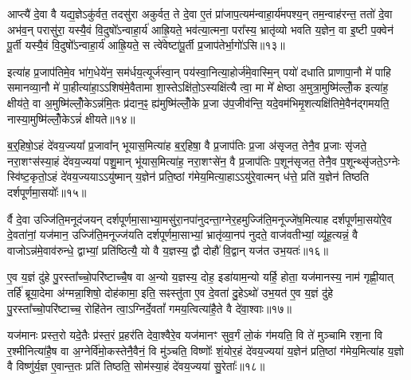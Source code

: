 आप्त्यै॑ दे॒वा वै यद्य॒ज्ञे\-ऽकु॑र्वत॒ तदसु॑रा अकुर्वत॒ ते दे॒वा ए॒तं प्रा॑जाप॒त्यम॑न्वाहा॒र्य॑मपश्य॒न् तम॒न्वाह॑रन्त॒ ततो॑ दे॒वा अभ॑व॒न् परासु॑रा॒ यस्यै॒वं वि॒दुषो᳚\-ऽन्वाहा॒र्य॑ आह्रि॒यते॒ भव॑त्या॒त्मना॒ परा᳚स्य॒ भ्रातृ॑व्यो भवति य॒ज्ञेन॒ वा इ॒ष्टी प॒क्वेन॑ पू॒र्ती यस्यै॒वं वि॒दुषो᳚\-ऽन्वाहा॒र्य॑ आह्रि॒यते॒ स त्वे॑वेष्टा॑पू॒र्ती प्र॒जाप॑तेर्भा॒गो॑\-ऽसि॥१३॥

इत्या॑ह प्र॒जाप॑तिमे॒व भा॑ग॒धेये॑न॒ सम॑र्धय॒त्यूर्ज॑स्वा॒न् पय॑स्वा॒नित्या॒होर्ज॑मे॒वास्मि॒न् पयो॑ दधाति प्राणापा॒नौ मे॑ पाहि समानव्या॒नौ मे॑ पा॒हीत्या॑हा॒\-ऽ\-ऽशिष॑मे॒वैतामा शा॒स्ते\-ऽक्षि॑तो॒\-ऽस्यक्षि॑त्यै त्वा॒ मा मे᳚ क्षेष्ठा अ॒मुत्रा॒मुष्मि॑ल्लोँ॒क इत्या॑ह॒ क्षीय॑ते॒ वा अ॒मुष्मि॑ल्लोँ॒के\-ऽन्न॑मि॒तः प्र॑दान॒ꣴ॒ ह्य॑मुष्मि॑ल्लोँ॒के प्र॒जा उ॑प॒जीव॑न्ति॒ यदे॒वम॑भिमृ॒शत्यक्षि॑तिमे॒वैन॑द्गमयति॒ नास्या॒मुष्मि॑ल्लोँ॒के\-ऽन्नं॑ क्षीयते॥१४॥

{\anuvakamend[{अ॒न्वा॒हा॒र्ये॑ण प्र॒जाप॑तेरसि॒ ह्य॑मुष्मि॑ल्लोँ॒के पञ्च॑दश च॥३॥}]}

ब॒र्॒\mbox{}हिषो॒\-ऽहं दे॑वय॒ज्यया᳚ प्र॒जावा᳚न् भूयास॒मित्या॑ह ब॒र्॒\mbox{}हिषा॒ वै प्र॒जाप॑तिः प्र॒जा अ॑सृजत॒ तेनै॒व प्र॒जाः सृ॑जते॒ नरा॒शꣳस॑स्या॒हं दे॑वय॒ज्यया॑ पशु॒मान् भू॑यास॒मित्या॑ह॒ नरा॒शꣳसे॑न॒ वै प्र॒जाप॑तिः प॒शून॑सृजत॒ तेनै॒व प॒शून्थ्सृ॑जते॒\-ऽग्नेः स्वि॑ष्ट॒कृतो॒\-ऽहं दे॑वय॒ज्यया\-ऽ\-ऽयु॑ष्मान् य॒ज्ञेन॑ प्रति॒ष्ठां ग॑मेय॒मित्या॒हा\-ऽ\-ऽयु॑रे॒वात्मन् ध॑त्ते॒ प्रति॑ य॒ज्ञेन॑ तिष्ठति दर्\mbox{}शपूर्णमा॒सयोः᳚॥१५॥

र्वै दे॒वा उज्जि॑ति॒मनूद॑जयन् दर्\mbox{}शपूर्णमा॒साभ्या॒मसु॑रा॒नपा॑नुदन्ता॒ग्नेर॒हमुज्जि॑ति॒मनूज्जे॑ष॒मित्याह दर्\mbox{}शपूर्णमा॒सयो॑रे॒व दे॒वता॑नां॒ यज॑मान॒ उज्जि॑ति॒मनूज्ज॑यति दर्\mbox{}शपूर्णमा॒साभ्यां॒ भ्रातृ॑व्या॒नप॑ नुदते॒ वाज॑वतीभ्यां॒ व्यू॑ह॒त्यन्नं॒ वै वाजो\-ऽन्न॑मे॒वाव॑रुन्धे॒ द्वाभ्यां॒ प्रति॑ष्ठित्यै॒ यो वै य॒ज्ञस्य॒ द्वौ दोहौ॑ वि॒द्वान् यज॑त उभ॒यतः॑॥१६॥

ए॒व य॒ज्ञं दु॑हे पु॒रस्ता᳚च्चो॒परि॑ष्टाच्चै॒ष वा अ॒न्यो य॒ज्ञस्य॒ दोह॒ इडा॑याम॒न्यो यर्\mbox{}हि॒ होता॒ यज॑मानस्य॒ नाम॑ गृह्णी॒यात् तर्\mbox{}हि॑ ब्रूया॒देमा अ॑ग्मन्ना॒शिषो॒ दोह॑कामा॒ इति॒ सꣴस्तु॑ता ए॒व दे॒वता॑ दु॒हे\-ऽथो॑ उभ॒यत॑ ए॒व य॒ज्ञं दु॑हे पु॒रस्ता᳚च्चो॒परि॑ष्टाच्च॒ रोहि॑तेन त्वा॒\-ऽग्निर्दे॒वतां᳚ गमय॒त्वित्या॑है॒ते वै दे॑वा॒श्वाः॥१७॥

यज॑मानः प्रस्त॒रो यदे॒तैः प्र॑स्त॒रं प्र॒हर॑ति देवा॒श्वैरे॒व यज॑मानꣳ सुव॒र्गं लो॒कं ग॑मयति॒ वि ते॑ मुञ्चामि रश॒ना वि र॒श्मीनित्या॑है॒ष वा अ॒ग्नेर्वि॑मो॒कस्तेनै॒वैनं॒ वि मु॑ञ्चति॒ विष्णोः᳚ शं॒योर॒हं दे॑वय॒ज्यया॑ य॒ज्ञेन॑ प्रति॒ष्ठां ग॑मेय॒मित्या॑ह य॒ज्ञो वै विष्णु॑र्य॒ज्ञ ए॒वान्त॒तः प्रति॑ तिष्ठति॒ सोम॑स्या॒हं दे॑वय॒ज्यया॑ सु॒रेताः᳚॥१८॥

